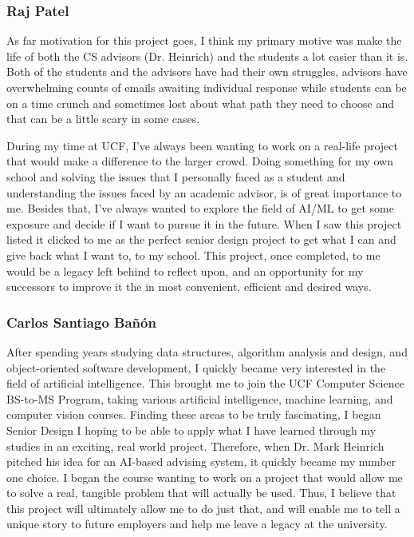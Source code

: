 \documentclass[titlepage, 12pt]{article}
\begin{document}
\subsubsection{Raj Patel}

As far motivation for this project goes, I think my primary motive was make the life of both the CS advisors (Dr. Heinrich) and the students a lot easier than it is. Both of the students and the advisors have had their own struggles, advisors have overwhelming counts of emails awaiting individual response while students can be on a time crunch and sometimes lost about what path they need to choose and that can be a little scary in some cases. 

During my time at UCF, I’ve always been wanting to work on a real-life project that would make a difference to the larger crowd. Doing something for my own school and solving the issues that I personally faced as a student and understanding the issues faced by an academic advisor, is of great importance to me. Besides that, I’ve always wanted to explore the field of AI/ML to get some exposure and decide if I want to pursue it in the future. When I saw this project listed it clicked to me as the perfect senior design project to get what I can and give back what I want to, to my school. This project, once completed, to me would be a legacy left behind to reflect upon, and an opportunity for my successors to improve it the in most convenient, efficient and desired ways. 

\subsubsection{Carlos Santiago Bañón}

After spending years studying data structures, algorithm analysis and design, and object-oriented software development, I quickly became very interested in the field of artificial intelligence. This brought me to join the UCF Computer Science BS-to-MS Program, taking various artificial intelligence, machine learning, and computer vision courses. Finding these areas to be truly fascinating, I began Senior Design I hoping to be able to apply what I have learned through my studies in an exciting, real world project. Therefore, when Dr. Mark Heinrich pitched his idea for an AI-based advising system, it quickly became my number one choice. I began the course wanting to work on a project that would allow me to solve a real, tangible problem that will actually be used. Thus, I believe that this project will ultimately allow me to do just that, and will enable me to tell a unique story to future employers and help me leave a legacy at the university.
\end{document}
